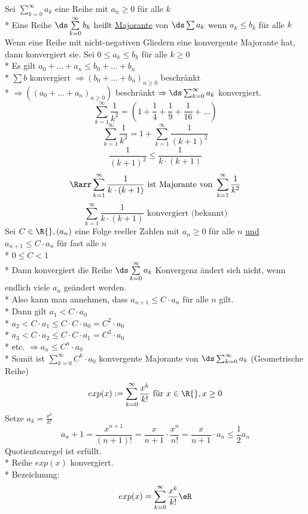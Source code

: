 Sei $\displaystyle\sum\limits_{k=0}^{\infty} a_k$ eine Reihe mit $a_n \geq 0$ für alle $k$\\*
Eine Reihe $\ds\sum\limits_{k=0}^{\infty} b_k$ heißt \ul{Majorante} von $\ds\sum a_k$ wenn $a_k \leq b_k$ für alle $k$
Wenn eine Reihe mit nicht-negativen Gliedern eine konvergente Majorante hat, dann konvergiert sie.
\bew
Sei $0 \leq a_k \leq b_k$ für alle $k \geq 0$\\*
Es gilt $a_0 + ... + a_n \leq b_0 + ... + b_n$ \\*
$\sum b$ konvergiert $\Rightarrow (b_0 + ... + b_n)_{n \geq 0}$  beschränkt\\*
$\Rightarrow ((a_0 + ... + a_n)_{n \geq 0})$ beschränkt $\Rightarrow \ds\sum_{k= 0}^{\infty} a_k$ konvergiert.
$$\sum\limits_{k=1}^{\infty} \frac{1}{k^2} = \left( 1 + \frac{1}{4} + \frac{1}{9}+ \frac{1}{16} + … \right)$$
$$\sum\limits_{k=1}^{\infty} \frac{1}{k^2} = 1 + \sum\limits_{k=1}^{\infty} \frac{1}{(k + 1)^2}$$
$$\frac{1}{(k + 1)^2} \leq \frac{1}{k \cdot (k + 1)}$$
$$\Rarr \sum\limits_{k=1}^{\infty} \frac{1}{k \cdot (k + 1)}\text{ ist Majorante von }\sum\limits_{k=1}^{\infty} \frac{1}{k^2}$$
$$\sum\limits_{k=1}^{\infty} \frac{1}{k \cdot (k + 1)}\text{ konvergiert (bekannt)}$$
Sei $C \in \R{}, (a_n)$ eine Folge reeller Zahlen mit $a_n \geq 0$ für alle $n$ \ul{und} $a_{n + 1} \leq C \cdot a_n$ für fast alle $n$\\*
$0 \leq C < 1$\\*
Dann konvergiert die Reihe $\ds\sum\limits_{k=0}^{\infty} a_k$
\bew
Konvergenz ändert sich nicht, wenn endlich viele $a_n$ geändert werden.\\*
Also kann man annehmen, dass $a_{n + 1} \leq C \cdot a_n$ für alle $n$ gilt.\\*
Dann gilt $a_1 < C \cdot a_0$\\*
$a_2 < C \cdot a_1 \leq C \cdot C \cdot a_0 = C^2 \cdot a_0$\\*
$a_3 < C \cdot a_2 \leq C \cdot C \cdot a_1 = C^3 \cdot a_0$\\*
etc. $\Rightarrow a_n \leq C^n \cdot a_0$\\*
Somit ist $\displaystyle\sum\limits_{k=0}^{\infty} C^k \cdot a_0$ konvergente Majorante von $\ds\sum_{k=0}^{\infty} a_k$ (Geometrische Reihe)
$$exp(x) := \sum\limits_{k=0}^{\infty} \frac{x^k}{k!} \text{ für } x \in \R{}, x \geq 0$$
Setze $a_k = \frac{x^k}{k!}$
$$a_n+1 = \frac{x^{n + 1}}{(n + 1)!} = \frac{x}{n+1} \cdot \frac{x^n}{n!} = \frac{x}{n+1} \cdot a_n \leq \frac{1}{2} a_n$$
\Rarr{} Quotientenregel ist erfüllt.\\*
Reihe $exp(x)$ konvergiert.\\*
Bezeichnung: $$exp(x) = \sum_{k=0}^{\infty} \frac{x^k}{k!} \eR$$

